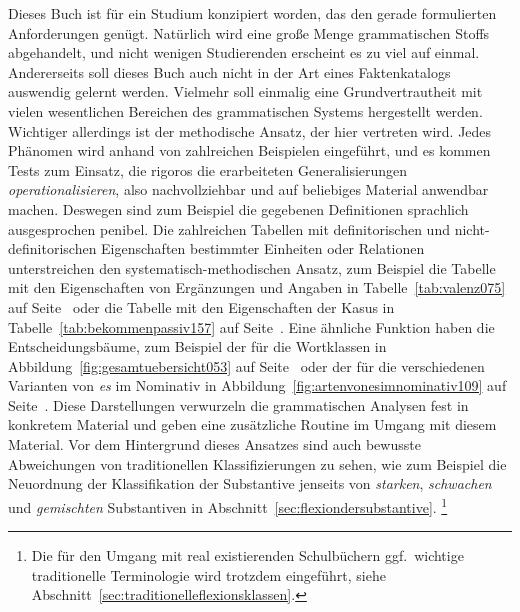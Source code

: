 Dieses Buch ist für ein Studium konzipiert worden, das den gerade formulierten Anforderungen genügt.
Natürlich wird eine große Menge grammatischen Stoffs abgehandelt, und nicht wenigen Studierenden erscheint es zu viel auf einmal.
Andererseits soll dieses Buch auch nicht in der Art eines Faktenkatalogs auswendig gelernt werden.
Vielmehr soll einmalig eine Grundvertrautheit mit vielen wesentlichen Bereichen des grammatischen Systems hergestellt werden.
Wichtiger allerdings ist der methodische Ansatz, der hier vertreten wird.
Jedes Phänomen wird anhand von zahlreichen Beispielen eingeführt, und es kommen Tests zum Einsatz, die rigoros die erarbeiteten Generalisierungen \textit{operationalisieren}, also nachvollziehbar und auf beliebiges Material anwendbar machen.
Deswegen sind zum Beispiel die gegebenen Definitionen sprachlich ausgesprochen penibel.
Die zahlreichen Tabellen mit definitorischen und nicht-definitorischen Eigenschaften bestimmter Einheiten oder Relationen unterstreichen den systematisch-methodischen Ansatz, zum Beispiel die Tabelle mit den Eigenschaften von Ergänzungen und Angaben in Tabelle~\ref{tab:valenz075} auf Seite~\pageref{tab:valenz075} oder die Tabelle mit den Eigenschaften der Kasus in Tabelle~\ref{tab:bekommenpassiv157} auf Seite~\pageref{tab:bekommenpassiv157}.
Eine ähnliche Funktion haben die Entscheidungsbäume, zum Beispiel der für die Wortklassen in Abbildung~\ref{fig:gesamtuebersicht053} auf Seite~\pageref{fig:gesamtuebersicht053} oder der für die verschiedenen Varianten von \textit{es} im Nominativ in Abbildung~\ref{fig:artenvonesimnominativ109} auf Seite~\pageref{fig:artenvonesimnominativ109}.
Diese Darstellungen verwurzeln die grammatischen Analysen fest in konkretem Material und geben eine zusätzliche Routine im Umgang mit diesem Material.
Vor dem Hintergrund dieses Ansatzes sind auch bewusste Abweichungen von traditionellen Klassifizierungen zu sehen, wie zum Beispiel die Neuordnung der Klassifikation der Substantive jenseits von \textit{starken}, \textit{schwachen} und \textit{gemischten} Substantiven in Abschnitt~\ref{sec:flexiondersubstantive}.%
\footnote{Die für den Umgang mit real existierenden Schulbüchern ggf.\ wichtige traditionelle Terminologie wird trotzdem eingeführt, siehe Abschnitt~\ref{sec:traditionelleflexionsklassen}.}

